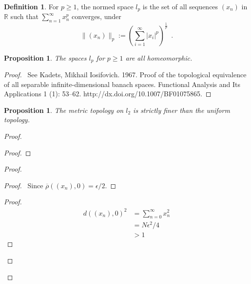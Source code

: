 \documentclass{book}
\let\qed\relax
\newtheorem{prop}[ax]{Proposition}
\theoremstyle{definition}
\newtheorem{df}[ax]{Definition}
\begin{document}
\begin{df}
For $p \geq 1$, the normed space $l_p$ is the set of all sequences $(x_n)$ in $\mathbb{R}$ such that $\sum_{n=1}^\infty x_n^p$ converges, under
\[ \| (x_n) \|_p := \left( \sum_{i=1}^\infty |x_i|^p \right)^{\frac{1}{p}} \enspace . \]
\end{df}

\begin{prop}
The spaces $l_p$ for $p \geq 1$ are all homeomorphic.
\end{prop}

\begin{proof}
\pf\ See Kadets, Mikhail Iosifovich. 1967. Proof of the topological equivalence of all separable
infinite-dimensional banach spaces. Functional Analysis and Its Applications 1 (1): 53–62.
http://dx.doi.org/10.1007/BF01075865.
\end{proof}

\begin{prop}
The metric topology on $l_2$ is strictly finer than the uniform topology.
\end{prop}

\begin{proof}
\pf
{}
\begin{proof}
\end{proof}
\begin{proof}
	\begin{proof}
		\pf\ Since $\overline{\rho}((x_n),0) = \epsilon / 2$.
	\end{proof}
	\begin{proof}
		\pf
		\begin{align*}
			d((x_n),0)^2 & = \sum_{n=0}^\infty x_n^2 \\
			& = N \epsilon^2 / 4 \\
			& > 1 
		\end{align*}
	\end{proof}
\end{proof}
\qed
\end{proof}
\end{document}
